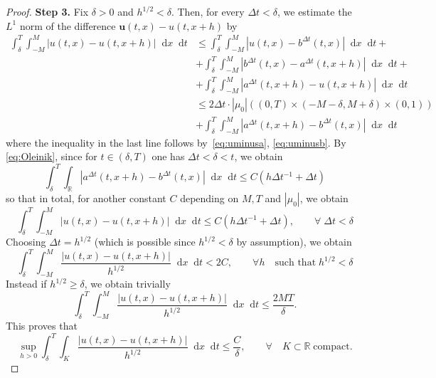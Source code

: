 \documentclass[10pt,a4paper]{amsart}
\newcommand*\dif{\mathop{}\!\mathrm{d}}
\newcommand{\bs}[1]{\boldsymbol{#1}}
\begin{document}
\begin{proof}
\vspace{0.5cm}
\textbf{Step 3.} Fix $\delta > 0$ and  $h^{1/2} < \delta$. Then, for every $\Delta t < \delta$, we estimate the $L^1$ norm of the difference $\bs u(t,x) -u(t,x+h)$ by
\begin{equation}
    \begin{aligned}
        \int_{\delta}^T \int_{-M}^M |u(t, x) -u(t, x+h)| \dif x  \dif t & \leq  \int_{\delta}^T \int_{-M}^M |u(t, x) -b^{\Delta t}(t, x)| \dif x \dif t+\\
        & + \int_{\delta}^T \int_{-M}^M |b^{\Delta t}(t, x)-a^{\Delta t}(t, x+h)| \dif x \dif t + \\
     & + \int_{\delta}^T\int_{-M}^M |a^{\Delta t}(t, x+h)-u(t, x+h)| \dif x \dif t \\
        & \leq 2 \Delta t\cdot |\mu_0|((0, T) \times (-M-\delta, M +\delta) \times (0, 1)) \\
        & + \int_{\delta}^T \int_{-M}^M |a^{\Delta t}(t, x+h)-b^{\Delta t}(t, x)| \dif x \dif t
    \end{aligned}
\end{equation}
where the inequality in the last line follows by~\eqref{eq:uminusa}, \eqref{eq:uminusb}.
By \eqref{eq:Oleinik}, since for $t \in (\delta, T)$ one has $\Delta t < \delta < t$, we obtain
$$
 \int_{\delta}^T \int _{\mathbb R} |a^{\Delta t}(t, x+h)-b^{\Delta t}(t, x)| \dif x \dif t \leq C(h\Delta t^{-1} + \Delta t)
$$
so that in total, for another constant $C$ depending on $M, T$ and $|\mu_0|$, we obtain
\begin{equation}
    \int_{\delta}^T \int_{-M}^M |u(t, x) -u(t, x+h)| \dif x  \dif t  \leq C(h\Delta t^{-1} + \Delta t), \qquad \forall \; \Delta t < \delta
\end{equation}
Choosing $\Delta t = h^{1/2}$ (which is possible since $h^{1/2} < \delta$ by assumption), we obtain 
\begin{equation}
 \int_{\delta}^T \int_{-M}^M \frac{|u(t, x) -u(t, x+h)|}{h^{1/2}} \dif x  \dif t  <2 C, \qquad \forall h \quad \text{such that} \; h^{1/2} < \delta
\end{equation}
Instead if $h^{1/2} \geq \delta$, we obtain trivially
\begin{equation}
 \int_{\delta}^T \int_{-M}^M \frac{|u(t, x) -u(t, x+h)|}{h^{1/2}} \dif x  \dif t  \leq\frac{2MT}{\delta}.
\end{equation}
This proves that
\begin{equation}
 \sup_{h > 0} \int_{\delta}^T \int_{K} \frac{|u(t, x) -u(t, x+h)|}{h^{1/2}} \dif x  \dif t  \leq \frac{C}{\delta}, \qquad \forall \quad K \subset \mathbb R \; \text{compact}.
\end{equation}
\end{proof}
\end{document}
